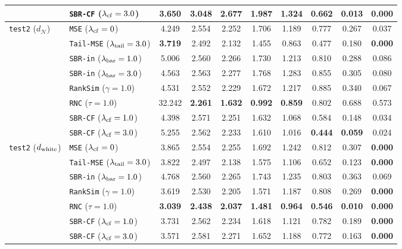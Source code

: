 \documentclass[preprint,11pt,a4paper]{elsarticle}
\begin{document}
\begin{table}[ht!]
{\begin{tabular}{llcccccccc}
 & \texttt{SBR-CF} ($\lambda_{\rm cf}=3.0$) & 3.650 & 3.048 & 2.677 & 1.987 & 1.324 & 0.662 & 0.013 & \textbf{0.000} \\
\midrule
\texttt{test2} ($d_{\mathcal N}$)
 & \texttt{MSE} ($\lambda_{\rm cf}=0$) & 4.249 & 2.554 & 2.252 & 1.706 & 1.189 & 0.777 & 0.267 & 0.037 \\
 & \texttt{Tail-MSE} ($\lambda_{\rm tail}=3.0$) & \textbf{3.719} & 2.492 & 2.132 & 1.455 & 0.863 & 0.477 & 0.180 & \textbf{0.000} \\
 & \texttt{SBR-in} ($\lambda_{\rm bar}=1.0$) & 5.006 & 2.560 & 2.266 & 1.730 & 1.213 & 0.810 & 0.288 & 0.086 \\
 & \texttt{SBR-in} ($\lambda_{\rm bar}=3.0$) & 4.563 & 2.563 & 2.277 & 1.768 & 1.283 & 0.855 & 0.305 & 0.080 \\
 & \texttt{RankSim} ($\gamma=1.0$) & 4.531 & 2.552 & 2.229 & 1.672 & 1.217 & 0.885 & 0.340 & 0.067 \\
 & \texttt{RNC} ($\tau=1.0$) & 32.242 & \textbf{2.261} & \textbf{1.632} & \textbf{0.992} & \textbf{0.859} & 0.802 & 0.688 & 0.573 \\
 & \texttt{SBR-CF} ($\lambda_{\rm cf}=1.0$) & 4.398 & 2.571 & 2.251 & 1.632 & 1.068 & 0.584 & 0.148 & 0.034 \\
 & \texttt{SBR-CF} ($\lambda_{\rm cf}=3.0$) & 5.255 & 2.562 & 2.233 & 1.610 & 1.016 & \textbf{0.444} & \textbf{0.059} & 0.024 \\
\midrule
\texttt{test2} ($d_{\rm white}$)
 & \texttt{MSE} ($\lambda_{\rm cf}=0$) & 3.865 & 2.554 & 2.255 & 1.692 & 1.242 & 0.812 & 0.307 & \textbf{0.000} \\
 & \texttt{Tail-MSE} ($\lambda_{\rm tail}=3.0$) & 3.822 & 2.497 & 2.138 & 1.575 & 1.106 & 0.652 & 0.123 & \textbf{0.000} \\
 & \texttt{SBR-in} ($\lambda_{\rm bar}=1.0$) & 4.768 & 2.560 & 2.265 & 1.743 & 1.235 & 0.803 & 0.363 & 0.069 \\
 & \texttt{RankSim} ($\gamma=1.0$) & 3.619 & 2.530 & 2.205 & 1.571 & 1.187 & 0.808 & 0.269 & \textbf{0.000} \\
 & \texttt{RNC} ($\tau=1.0$) & \textbf{3.039} & \textbf{2.438} & \textbf{2.037} & \textbf{1.481} & \textbf{0.964} & \textbf{0.546} & \textbf{0.010} & \textbf{0.000} \\
 & \texttt{SBR-CF} ($\lambda_{\rm cf}=1.0$) & 3.731 & 2.562 & 2.234 & 1.618 & 1.121 & 0.782 & 0.189 & \textbf{0.000} \\
 & \texttt{SBR-CF} ($\lambda_{\rm cf}=3.0$) & 3.571 & 2.581 & 2.271 & 1.652 & 1.188 & 0.772 & 0.163 & \textbf{0.000} \\
\bottomrule
\end{tabular}%
}
\end{table}
\end{document}
